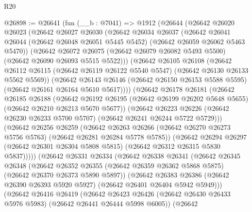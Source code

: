 \begin{lexlean}{R20}
\begin{coremodule}
{@26898 := @26641
    (fun (__b : @7041) =>
    @1912
      (@26644
        (@26642
          @26020
          @26023
          (@26642
            @26027
            @26030
            (@26642
              @26034
              @26037
              (@26642
                @26041
                @26044
                (@26642 @26048 @26051 @5445 @5452)
                (@26642 @26059 @26062 @5463 @5470))
              (@26642
                @26072
                @26075
                (@26642 @26079 @26082 @5493 @5500)
                (@26642 @26090 @26093 @5515 @5522)))
            (@26642
              @26105
              @26108
              (@26642
                @26112
                @26115
                (@26642 @26119 @26122 @5540 @5547)
                (@26642 @26130 @26133 @5562 @5569))
              (@26642
                @26143
                @26146
                (@26642 @26150 @26153 @5588 @5595)
                (@26642 @26161 @26164 @5610 @5617))))
          (@26642
            @26178
            @26181
            (@26642
              @26185
              @26188
              (@26642
                @26192
                @26195
                (@26642 @26199 @26202 @5648 @5655)
                (@26642 @26210 @26213 @5670 @5677))
              (@26642
                @26223
                @26226
                (@26642 @26230 @26233 @5700 @5707)
                (@26642 @26241 @26244 @5722 @5729)))
            (@26642
              @26256
              @26259
              (@26642
                @26263
                @26266
                (@26642 @26270 @26273 @5756 @5763)
                (@26642 @26281 @26284 @5778 @5785))
              (@26642
                @26294
                @26297
                (@26642 @26301 @26304 @5808 @5815)
                (@26642 @26312 @26315 @5830 @5837)))))
        (@26642
          @26331
          @26334
          (@26642
            @26338
            @26341
            (@26642
              @26345
              @26348
              (@26642
                @26352
                @26355
                (@26642 @26359 @26362 @5868 @5875)
                (@26642 @26370 @26373 @5890 @5897))
              (@26642
                @26383
                @26386
                (@26642 @26390 @26393 @5920 @5927)
                (@26642 @26401 @26404 @5942 @5949)))
            (@26642
              @26416
              @26419
              (@26642
                @26423
                @26426
                (@26642 @26430 @26433 @5976 @5983)
                (@26642 @26441 @26444 @5998 @6005))
              (@26642
}
\end{coremodule}
\end{lexlean}

